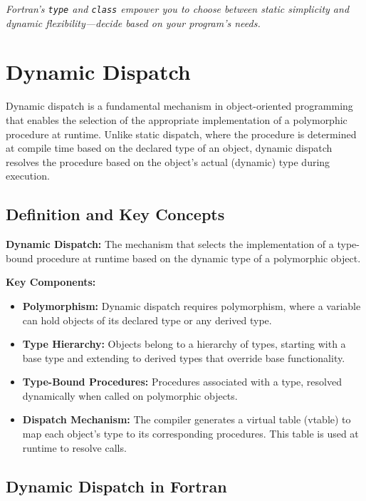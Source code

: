 \begin{center}
\textit{Fortran's \texttt{type} and \texttt{class} empower you to choose between static simplicity and dynamic flexibility—decide based on your program's needs.}
\end{center}


\section{Dynamic Dispatch}

Dynamic dispatch is a fundamental mechanism in object-oriented programming that enables the selection of the appropriate implementation of a polymorphic procedure at runtime. Unlike static dispatch, where the procedure is determined at compile time based on the declared type of an object, dynamic dispatch resolves the procedure based on the object's actual (dynamic) type during execution.

\subsection{Definition and Key Concepts}

\textbf{Dynamic Dispatch:} The mechanism that selects the implementation of a type-bound procedure at runtime based on the dynamic type of a polymorphic object.

\textbf{Key Components:}
\begin{itemize}
    \item \textbf{Polymorphism:} Dynamic dispatch requires polymorphism, where a variable can hold objects of its declared type or any derived type.
    \item \textbf{Type Hierarchy:} Objects belong to a hierarchy of types, starting with a base type and extending to derived types that override base functionality.
    \item \textbf{Type-Bound Procedures:} Procedures associated with a type, resolved dynamically when called on polymorphic objects.
    \item \textbf{Dispatch Mechanism:} The compiler generates a virtual table (vtable) to map each object's type to its corresponding procedures. This table is used at runtime to resolve calls.
\end{itemize}

\subsection{Dynamic Dispatch in Fortran}

